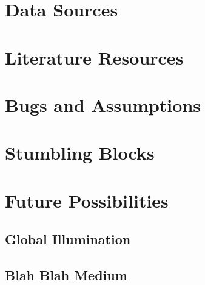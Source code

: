 \documentclass{article}
\begin{document}
\section{Data Sources}

\section{Literature Resources}

\section{Bugs and Assumptions}

\section{Stumbling Blocks}

\section{Future Possibilities}

\subsection{Global Illumination}

\subsection{Blah Blah Medium}
\end{document}
